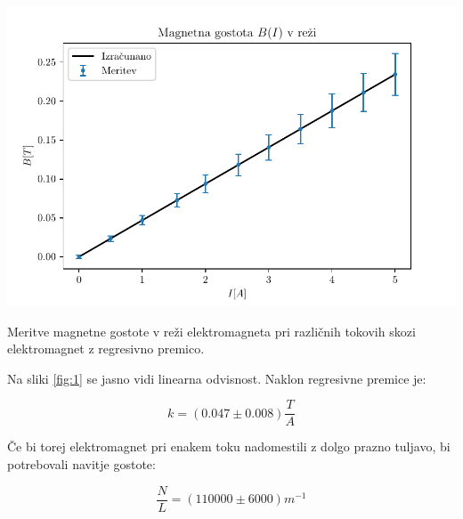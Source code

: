 \documentclass[12pt]{report}
\begin{document}
\begin{slika}[H]
  \centering
  \includegraphics{graf2}
  \caption{\small Meritve magnetne gostote v reži elektromagneta pri različnih tokovih skozi elektromagnet z regresivno premico.}
  \label{fig:1}
\end{slika}

Na sliki \ref{fig:1} se jasno vidi linearna odvisnost. Naklon regresivne premice je: 

\[k = (0.047 \pm 0.008) \frac{T}{A}\]

Če bi torej elektromagnet pri enakem toku nadomestili z dolgo prazno tuljavo, bi potrebovali navitje gostote: 

\[ \frac{N}{L} = (110000 \pm 6000) m^{-1}\]
\end{document}
